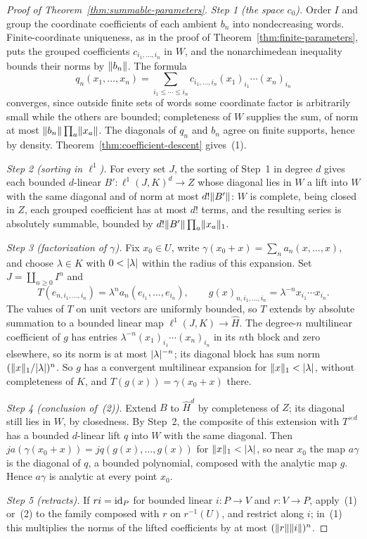 \begin{proof}[Proof of Theorem~\ref{thm:summable-parameters}]
\emph{Step 1 (the space $c_0$).} Order $I$ and group the coordinate coefficients of each ambient $b_n$ into
nondecreasing words. Finite-coordinate uniqueness, as in the proof of Theorem~\ref{thm:finite-parameters}, puts the
grouped coefficients $c_{i_1,\ldots,i_n}$ in $W$, and the nonarchimedean inequality bounds their norms by $\lVert b_n\rVert$.
The formula
\[
 q_n(x_1,\ldots,x_n)
 =\sum_{i_1\le\cdots\le i_n}
 c_{i_1,\ldots,i_n}(x_1)_{i_1}\cdots(x_n)_{i_n}
\]
converges, since outside finite sets of words some coordinate factor is arbitrarily small while the others are bounded;
completeness of $W$ supplies the sum, of norm at most $\lVert b_n\rVert\prod_a\lVert x_a\rVert$. The diagonals of $q_n$ and $b_n$
agree on finite supports, hence by density. Theorem~\ref{thm:coefficient-descent} gives~(1).

\emph{Step 2 (sorting in $\ell^1$).} For every set $J$, the sorting of Step~1 in degree $d$ gives each bounded
$d$-linear $B'\colon\ell^1(J,K)^d\to Z$ whose diagonal lies in $W$ a lift into $W$ with the same diagonal and of norm at
most $d!\lVert B'\rVert$: $W$ is complete, being closed in $Z$, each grouped coefficient has at most $d!$ terms, and the
resulting series is absolutely summable, bounded by $d!\lVert B'\rVert\prod_a\lVert x_a\rVert_1$.

\emph{Step 3 (factorization of $\gamma$).} Fix $x_0\in U$, write $\gamma(x_0+x)=\sum_na_n(x,\ldots,x)$, and choose
$\lambda\in K$ with $0<\lvert \lambda\rvert$ within the radius of this expansion. Set $J=\coprod_{n\ge0}I^n$ and
\[
 T(e_{n,i_1,\ldots,i_n})=\lambda^na_n(e_{i_1},\ldots,e_{i_n}),
 \qquad
 g(x)_{n,i_1,\ldots,i_n}=\lambda^{-n}x_{i_1}\cdots x_{i_n}.
\]
The values of $T$ on unit vectors are uniformly bounded, so $T$ extends by absolute summation to a bounded linear map
$\ell^1(J,K)\to\widehat H$. The degree-$n$ multilinear coefficient of $g$ has entries
$\lambda^{-n}(x_1)_{i_1}\cdots(x_n)_{i_n}$ in its $n$th block and zero elsewhere, so its norm is at most
$\lvert \lambda\rvert^{-n}$; its diagonal block has sum norm $(\lVert x\rVert_1/\lvert \lambda\rvert)^n$. So $g$ has a convergent multilinear
expansion for $\lVert x\rVert_1<\lvert \lambda\rvert$, without completeness of $K$, and $T(g(x))=\gamma(x_0+x)$ there.

\emph{Step 4 (conclusion of~(2)).} Extend $B$ to $\widehat H^d$ by completeness of $Z$; its diagonal still lies in $W$,
by closedness. By Step~2, the composite of this extension with $T^{\times d}$ has a bounded $d$-linear lift $q$ into $W$
with the same diagonal. Then $ja(\gamma(x_0+x))=jq(g(x),\ldots,g(x))$ for $\lVert x\rVert_1<\lvert \lambda\rvert$, so near $x_0$ the
map $a\gamma$ is the diagonal of $q$, a bounded polynomial, composed with the analytic map $g$. Hence $a\gamma$ is
analytic at every point $x_0$.

\emph{Step 5 (retracts).} If $ri=\mathrm{id}_P$ for bounded linear $i\colon P\to V$ and $r\colon V\to P$, apply~(1) or~(2) to
the family composed with $r$ on $r^{-1}(U)$, and restrict along $i$; in~(1) this multiplies the norms of the lifted
coefficients by at most $(\lVert r\rVert\lVert i\rVert)^n$.
\end{proof}

